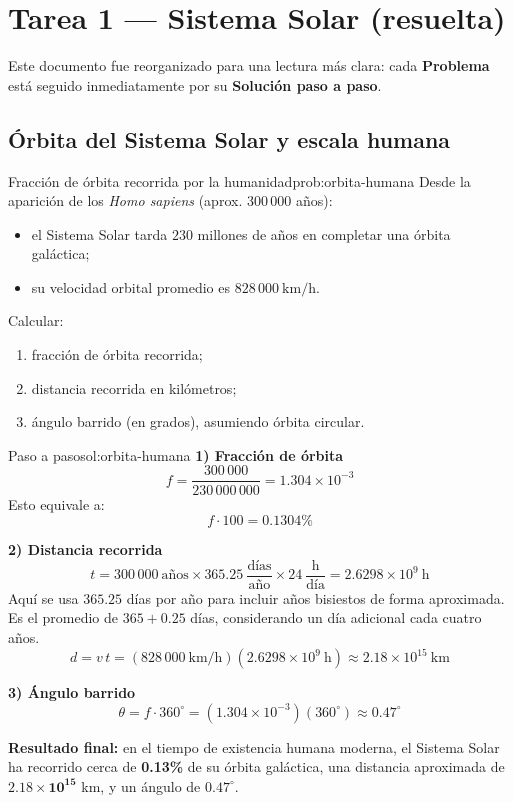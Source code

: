 \documentclass[12pt,oneside]{book}
\begin{document}
\frontmatter
\tableofcontents
\clearpage

\clearpage
\hypersetup{pageanchor=true}
\mainmatter
\chapter{Tarea 1 — Sistema Solar (resuelta)}

\begin{destacado}
Este documento fue reorganizado para una lectura más clara:
cada \textbf{Problema} está seguido inmediatamente por su
\textbf{Solución paso a paso}.
\end{destacado}

\section{Órbita del Sistema Solar y escala humana}

\begin{problema}{Fracción de órbita recorrida por la humanidad}{prob:orbita-humana}
Desde la aparición de los \textit{Homo sapiens} (aprox. $300\,000$ años):
\begin{itemize}[leftmargin=1.5em]
  \item el Sistema Solar tarda $230$ millones de años en completar una órbita galáctica;
  \item su velocidad orbital promedio es $828\,000\ \mathrm{km/h}$.
\end{itemize}
Calcular:
\begin{enumerate}[leftmargin=1.5em, label=\alph*)]
  \item fracción de órbita recorrida;
  \item distancia recorrida en kilómetros;
  \item ángulo barrido (en grados), asumiendo órbita circular.
\end{enumerate}
\end{problema}

\begin{solucion}{Paso a paso}{sol:orbita-humana}
\textbf{1) Fracción de órbita}
\[
f=\frac{300\,000}{230\,000\,000}=1.304\times 10^{-3}
\]
Esto equivale a:
\[
f\cdot 100=0.1304\%
\]

\textbf{2) Distancia recorrida}
\[
t=300\,000\ \text{años}\times 365.25\ \frac{\text{días}}{\text{año}}\times 24\ \frac{\text{h}}{\text{día}}
=2.6298\times 10^{9}\ \text{h}
\]
Aquí se usa \(365.25\) días por año para incluir años bisiestos de forma aproximada.
Es el promedio de \(365+0.25\) días, considerando un día adicional cada cuatro años.
\[
d=v\,t=(828\,000\ \mathrm{km/h})(2.6298\times10^9\ \mathrm{h})
\approx 2.18\times10^{15}\ \mathrm{km}
\]

\textbf{3) Ángulo barrido}
\[
\theta=f\cdot 360^\circ=(1.304\times10^{-3})(360^\circ)\approx 0.47^\circ
\]

\textbf{Resultado final:} en el tiempo de existencia humana moderna, el Sistema Solar
ha recorrido cerca de \textbf{0.13\%} de su órbita galáctica, una distancia aproximada
de \(\mathbf{2.18\times10^{15}}\) km, y un ángulo de \(\mathbf{0.47^\circ}\).
\end{solucion}
\end{document}
